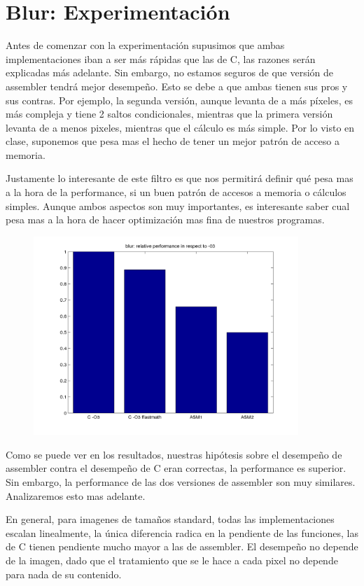 \section*{Blur: Experimentación}

Antes de comenzar con la experimentación supusimos que ambas implementaciones iban a ser más rápidas que las de C, las razones serán explicadas más adelante. Sin embargo, no estamos seguros de que versión de assembler tendrá mejor desempeño.
Esto se debe a que ambas tienen sus pros y sus contras. Por ejemplo, la segunda versión, aunque levanta de a más píxeles, es más compleja y tiene 2 saltos condicionales, mientras que la primera versión levanta de a menos pixeles, mientras que el cálculo es más simple. Por lo visto en clase, suponemos que pesa mas el hecho de tener un mejor patrón de acceso a memoria.

Justamente lo interesante de este filtro es que nos permitirá definir qué pesa mas a la hora de la performance, si un buen patrón de accesos a memoria o cálculos simples. Aunque ambos aspectos son muy importantes, es interesante saber cual pesa mas a la hora de hacer optimización mas fina de nuestros programas.

\begin{figure}[!hbt] 
  \includegraphics[width=10cm]{blur-random-uniform-pixel-fixed-size_barchart.png}
	\centering
\end{figure}


Como se puede ver en los resultados, nuestras hipótesis sobre el desempeño de assembler contra el desempeño de C eran correctas, la performance es superior. Sin embargo, la performance de las dos versiones de assembler son muy similares. Analizaremos esto mas adelante.


En general, para imagenes de tamaños standard, todas las implementaciones escalan linealmente, la única diferencia radica en la pendiente de las funciones, las de C tienen pendiente mucho mayor a las de assembler. El desempeño no depende de la imagen, dado que el tratamiento que se le hace a cada pixel no depende para nada de su contenido.
\\


